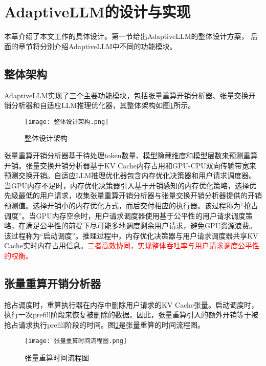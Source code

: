 \section{AdaptiveLLM的设计与实现}

本章介绍了本文工作的具体设计。第一节给出AdaptiveLLM的整体设计方案， 后面的章节将分别介绍AdaptiveLLM中不同的功能模块。

\subsection{整体架构}

AdaptiveLLM实现了三个主要功能模块，包括张量重算开销分析器、张量交换开销分析器和自适应LLM推理优化器，其整体架构如图\ref{Fig:整体设计架构}所示。

\begin{figure}[!htbp]
  \centering
  \texttt{[image: 整体设计架构.png]}
  \caption{整体设计架构}
  \label{Fig:整体设计架构}
\end{figure}

张量重算开销分析器基于待处理token数量、模型隐藏维度和模型层数来预测重算开销。张量交换开销分析器基于KV Cache内存占用和GPU-CPU双向传输带宽来预测交换开销。自适应LLM推理优化器包含内存优化决策器和用户请求调度器。当GPU内存不足时，内存优化决策器引入基于开销感知的内存优化策略，选择优先级最低的用户请求，收集张量重算开销分析器与张量交换开销分析器提供的开销预测值。选择开销小的内存优化方式，而后交付相应的执行器。该过程称为“抢占调度”。当GPU内存空余时，用户请求调度器使用基于公平性的用户请求调度策略，在满足公平性的前提下尽可能多地调度剩余用户请求，避免GPU资源浪费。该过程称为“启动调度”。推理过程中，内存优化决策器与用户请求调度器共享KV Cache实时内存占用信息。\textcolor{red}{二者高效协同，实现整体吞吐率与用户请求调度公平性的权衡。}

\subsection{张量重算开销分析器}

抢占调度时，重算执行器在内存中删除用户请求的KV Cache张量。启动调度时，执行一次prefill阶段来恢复被删除的数据。因此，张量重算引入的额外开销等于被抢占请求执行prefill阶段的时间。图\ref{Fig:张量重算时间流程图}是张量重算的时间流程图。

\begin{figure}[!htbp]
  \centering
  \texttt{[image: 张量重算时间流程图.png]}
  \caption{张量重算时间流程图}
  \label{Fig:张量重算时间流程图}
\end{figure}

